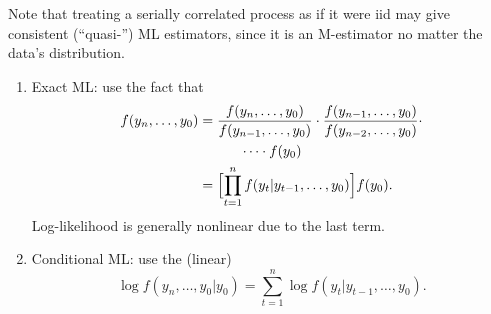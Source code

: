 \documentclass[8pt,letterpaper, landscape]{extarticle} %
\begin{document}
\begin{multicols}{3}
\begin{description}
 Note that treating a serially correlated process as if it were iid may give consistent (``quasi-'') ML estimators, since it is an M-estimator no matter the data's distribution.
\begin{enumerate}
\item Exact ML: use the fact that
\begin{align*}
f(y_n, \dotsc, y_0) &= \frac{f(y_n , \dotsc , y_0)}{f(y_{n-1} , \dotsc , y_0)} \cdot \frac{f(y_{n-1} , \dotsc , y_0)}{f(y_{n-2} , \dotsc , y_0)} \cdot \\
& \quad \quad \quad \dotsb \cdot f(y_0) \\
&= \Bigl [ \prod_{t=1}^{n} f(y_t | y_{t-1} , \dotsc , y_0) \Bigr ] f(y_0).
\end{align*}
Log-likelihood is generally nonlinear due to the last term.
\item Conditional ML: use the (linear)
\[ \log f(y_n, \dotsc , y_0 | y_0) = \sum_{t=1}^{n} \log f(y_t | y_{t-1} , \dotsc, y_0 ). \]
\end{enumerate}


\end{description}
\end{multicols}
\end{document}
